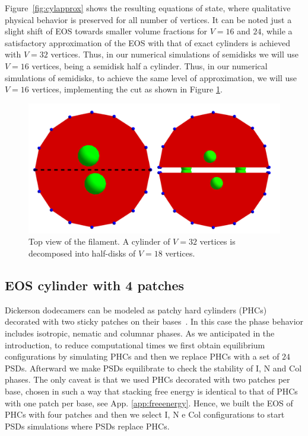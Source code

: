 \documentclass[aip,jcp, amsmath, amssymb, reprint]{revtex4-1}
\begin{document}
Figure~\ref{fig:cylapprox} shows the resulting equations of state, where qualitative physical behavior is preserved for
all number of vertices. It can be noted just a slight shift of EOS towards smaller volume fractions for $V= 16$ and $24$,
while a satisfactory approximation of the EOS with that of exact cylinders is achieved with $V=32$ vertices. 
Thus, in our numerical simulations of semidisks we will use $V=16$ vertices, being a semidisk half a cylinder. 
Thus, in our numerical simulations of semidisks, to achieve the same level of approximation, we will use $V=16$ vertices, implementing the cut as shown in Figure \ref{fig:cutcyl}.
\begin{figure}[h!] \includegraphics[width=0.7\linewidth]{taglio.png}
  \caption{\label{fig:cutcyl} Top view of the filament. A cylinder of $V=32$ vertices is decomposed into half-disks of $V=18$ vertices.}
\end{figure}

\subsection{EOS cylinder with 4 patches}
Dickerson dodecamers can be modeled as patchy hard cylinders (PHCs) decorated with two sticky patches on their 
bases~\cite{DeMichele12}. In this case the phase behavior includes isotropic, nematic and columnar phases.
As we anticipated in the introduction, to reduce computational times we first obtain equilibrium configurations
by simulating PHCs and then we replace PHCs with a set of $24$ PSDs. Afterward we make PSDs equilibrate to check the stability
of I, N and Col phases. The only caveat is that we used PHCs decorated with two patches per base, chosen in such a way 
that stacking free energy is identical to that of PHCs with one patch per base, see App. \ref{app:freeenergy}. 
Hence, we built the EOS of PHCs with four patches and then we select I, N e Col configurations to start PSDs simulations
where PSDs replace PHCs.
\end{document}
